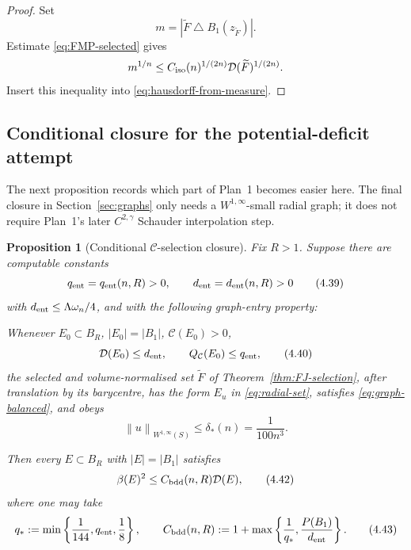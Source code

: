 \documentclass[11pt]{amsart}
\newtheorem{proposition}[theorem]{Proposition}
\theoremstyle{definition}
\newcommand{\Per}{P}
\newcommand{\norm}[1]{\left\|#1\right\|}
\newcommand{\Def}{\mathcal D}
\begin{document}
\begin{proof}
Set
\[
   m=|\widetilde F\mathbin{\triangle}B_1(z_{\widetilde F})|.
\]
Estimate \eqref{eq:FMP-selected} gives
\[
   m^{1/n}\le C_{\rm iso}(n)^{1/(2n)}
                 \Def(\widetilde F)^{1/(2n)}.
\]
Insert this inequality into \eqref{eq:hausdorff-from-measure}.
\end{proof}

\subsection{Conditional closure for the potential-deficit attempt}

The next proposition records which part of Plan~1 becomes easier here.  The
final closure in Section~\ref{sec:graphs} only needs a
\(W^{1,\infty}\)-small radial graph; it does not require Plan~1's later
\(C^{2,\gamma}\) Schauder interpolation step.

\begin{proposition}[Conditional \(\mathcal C\)-selection closure]\label{prop:FJ-conditional-close}
Fix \(R>1\).  Suppose there are computable constants
\[
   q_{\rm ent}=q_{\rm ent}(n,R)>0,\qquad
   d_{\rm ent}=d_{\rm ent}(n,R)>0
\tag{4.39}\label{eq:entry-constants}
\]
with \(d_{\rm ent}\le\Lambda\omega_n/4\), and with the following
graph-entry property:

\smallskip
\emph{Whenever \(E_0\subset B_R\), \(|E_0|=|B_1|\),
\(\mathcal C(E_0)>0\),}
\[
   \Def(E_0)\le d_{\rm ent},\qquad
   Q_{\mathcal C}(E_0)\le q_{\rm ent},
\tag{4.40}\label{eq:entry-input}
\]
\emph{the selected and volume-normalised set \(\widetilde F\) of
Theorem~\ref{thm:FJ-selection}, after translation by its barycentre, has the
form \(E_u\) in \eqref{eq:radial-set}, satisfies \eqref{eq:graph-balanced},
and obeys}
\[
   \norm{u}_{W^{1,\infty}(S)}\le\delta_*(n)=\frac1{100n^3}.
\tag{4.41}\label{eq:entry-output}
\]

Then every \(E\subset B_R\) with \(|E|=|B_1|\) satisfies
\[
   \beta(E)^2\le C_{\rm bdd}(n,R)\Def(E),
\tag{4.42}\label{eq:bounded-effective-FJ}
\]
where one may take
\[
   q_*:=\min\left\{\frac1{144},q_{\rm ent},\frac18\right\},
\qquad
   C_{\rm bdd}(n,R)
   :=1+\max\left\{\frac1{q_*},
                   \frac{\Per(B_1)}{d_{\rm ent}}\right\}.
\tag{4.43}\label{eq:C-bdd}
\]
\end{proposition}
\end{document}
